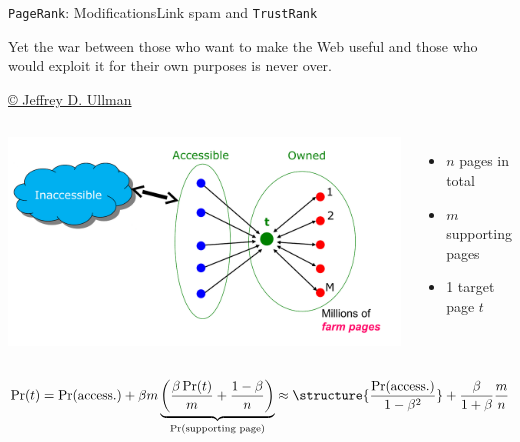 \documentclass[xcolor=table,final]{beamer} %
\newcommand{\PageRank}{\texttt{PageRank}\xspace}
\newcommand{\TrustRank}{\texttt{TrustRank}\xspace}
\begin{document}
\begin{frame}{\PageRank : Modifications}{Link spam and \TrustRank}
  \begin{exampleblock}{}
    Yet the war between those who want to make the Web useful and those
    who would exploit it for their own purposes is never over.

    \href{http://static.googleusercontent.com/media/research.google.com/en//archive/gfs-sosp2003.pdf}{\tiny \copyright 
      Jeffrey D. Ullman %
    }
  \end{exampleblock}

  \begin{columns}
    \includegraphics[width=\textwidth]{figs/pdf/spamfarm}

    \begin{itemize}
    \item $n$ pages in total
    \item $m$ supporting pages
    \item 1 target page $t$
    \end{itemize}
  \end{columns}
  \begin{equation*}
    \Pr(t) = \Pr(\text{access.}) + \beta m 
    \underbrace{\left( \frac{\beta \Pr(t)}{m} + \frac{1-\beta}{n} \right)}_{\Pr(\text{supporting page})}
    \approx
    \structure{\frac{\Pr(\text{access.})}{1-\beta^2}} + \frac{\beta}{1+\beta} \frac{m}{n}
  \end{equation*}
\end{frame}
\end{document}
